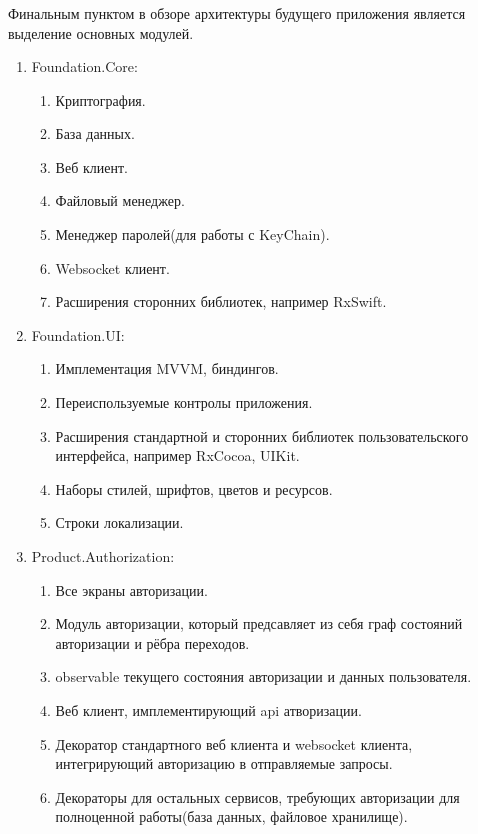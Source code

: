 \subsubsection{}
\label{sec:development:arch:ios:modules}

Финальным пунктом в обзоре архитектуры будущего приложения является выделение основных модулей.

\begin{enumerate}
	
	\item Foundation.Core:
	\begin{enumerate}
		\item Криптография.
		\item База данных.
		\item Веб клиент.
		\item Файловый менеджер.
		\item Менеджер паролей(для работы с KeyChain).
		\item Websocket клиент.
		\item Расширения сторонних библиотек, например RxSwift.
	\end{enumerate}

	\item Foundation.UI:
	\begin{enumerate}
		\item Имплементация MVVM, биндингов.
		\item Переиспользуемые контролы приложения.
		\item Расширения стандартной и сторонних библиотек пользовательского интерфейса, например RxCocoa, UIKit.
		\item Наборы стилей, шрифтов, цветов и ресурсов.
		\item Строки локализации.
	\end{enumerate}

	\item Product.Authorization:
	\begin{enumerate}
		\item Все экраны авторизации.
		\item Модуль авторизации, который предсавляет из себя граф состояний авторизации и рёбра переходов.
		\item \gls{observable} текущего состояния авторизации и данных пользователя.
		\item Веб клиент, имплементирующий \gls{api} атворизации.
		\item Декоратор стандартного веб клиента и websocket клиента, интегрирующий авторизацию в отправляемые запросы.
		\item Декораторы для остальных сервисов, требующих авторизации для полноценной работы(база данных, файловое хранилище).
	\end{enumerate}


\end{enumerate}
